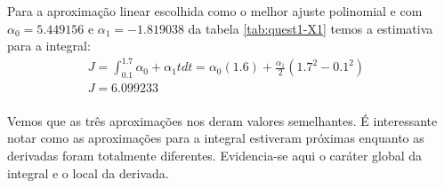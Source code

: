Para a aproximação linear escolhida como o melhor ajuste polinomial e 
com $\alpha_0 = 5.449156$ e $\alpha_1 = -1.819038$ da tabela \ref{tab:quest1-X1}
temos a estimativa para a integral:
\begin{equation}
\begin{array}{ll}
  J = \int_{0.1}^{1.7} \alpha_0 + \alpha_1t dt = \alpha_0(1.6) + \frac{\alpha_1}{2}(1.7^2 - 0.1^2)  & \\
  J = 6.099233
 \end{array}
\label{eq:int_linear}
\end{equation} 

\paragraph{} Vemos que as três aproximações nos deram valores semelhantes. É interessante
notar como as aproximações para a integral estiveram próximas enquanto as derivadas foram 
totalmente diferentes. Evidencia-se aqui o caráter global da integral e o local da derivada.
